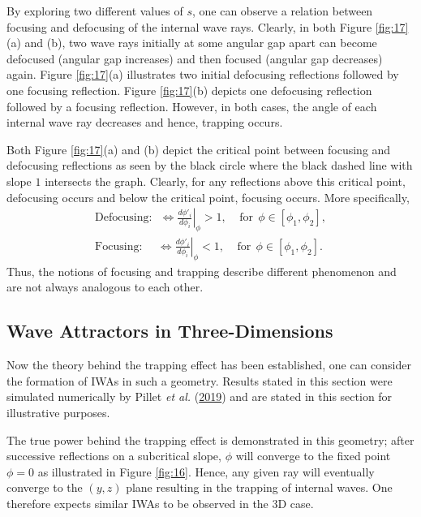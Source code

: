 \documentclass[a4paper]{article}
\numberwithin{equation}{section}
\begin{document}
By exploring two different values of $s$, one can observe a relation between focusing and defocusing of the internal wave rays. Clearly, in both Figure \ref{fig:17}(a) and (b), two wave rays initially at some angular gap apart can become defocused (angular gap increases) and then focused (angular gap decreases) again. Figure \ref{fig:17}(a) illustrates two initial defocusing reflections followed by one focusing reflection. Figure \ref{fig:17}(b) depicts one defocusing reflection followed by a focusing reflection. However, in both cases, the angle of each internal wave ray decreases and hence, trapping occurs. 

Both Figure \ref{fig:17}(a) and (b) depict the critical point between focusing and defocusing reflections as seen by the black circle where the black dashed line with slope $1$ intersects the graph. Clearly, for any reflections above this critical point, defocusing occurs and below the critical point, focusing occurs. More specifically, 
\begin{align*}
\text{Defocusing:} ~~~ \iff \left.\frac{d\phi'_i}{d\phi_i}\right|_{\phi} > 1, ~~~~~ \text{for}~~ \phi \in [\phi_1, \phi_2], \\
\text{Focusing:} ~~~~~~ \iff \left.\frac{d\phi'_i}{d\phi_i}\right|_{\phi} < 1, ~~~~~ \text{for}~~ \phi \in [\phi_1, \phi_2].
\end{align*}
Thus, the notions of focusing and trapping describe different phenomenon and are not always analogous to each other. 

\subsection{Wave Attractors in Three-Dimensions}
Now the theory behind the trapping effect has been established, one can consider the formation of IWAs in such a geometry. Results stated in this section were simulated numerically by Pillet \emph{et al.} (\hyperlink{ref 37}{2019}) and are stated in this section for illustrative purposes. 

The true power behind the trapping effect is demonstrated in this geometry; after successive reflections on a subcritical slope, $\phi$ will converge to the fixed point $\phi = 0$ as illustrated in Figure \ref{fig:16}. Hence, any given ray will eventually converge to the $(y, z)$ plane resulting in the trapping of internal waves. One therefore expects similar IWAs to be observed in the 3D case. 
\end{document}
